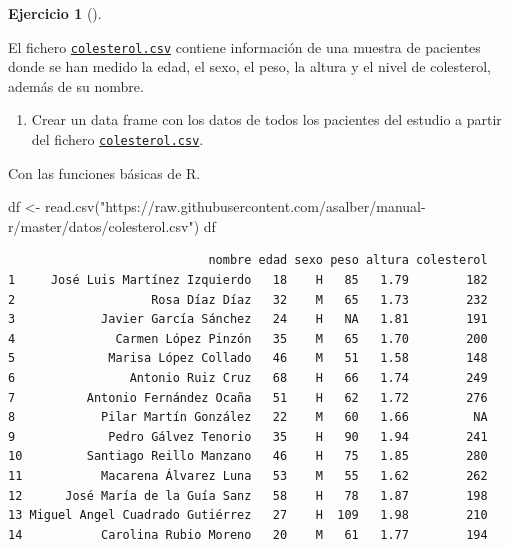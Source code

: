 \documentclass[
  a4paper,
]{scrreport}
\newenvironment{Shaded}{\begin{snugshade}}{\end{snugshade}}
\newcommand{\FunctionTok}[1]{\textcolor[rgb]{0.28,0.35,0.67}{#1}}
\newcommand{\NormalTok}[1]{\textcolor[rgb]{0.00,0.23,0.31}{#1}}
\newcommand{\OtherTok}[1]{\textcolor[rgb]{0.00,0.23,0.31}{#1}}
\newcommand{\StringTok}[1]{\textcolor[rgb]{0.13,0.47,0.30}{#1}}
\providecommand{\tightlist}{%
  \setlength{\itemsep}{0pt}\setlength{\parskip}{0pt}}\usepackage{longtable,booktabs,array}
\theoremstyle{definition}
\newtheorem{exercise}{Ejercicio}[chapter]
\theoremstyle{remark}
\begin{document}
\leavevmode{}%
\begin{exercise}[]\label{exr-preprocesamiento-2}

El fichero \href{datos/colesterol.csv}{\texttt{colesterol.csv}} contiene
información de una muestra de pacientes donde se han medido la edad, el
sexo, el peso, la altura y el nivel de colesterol, además de su nombre.

\begin{enumerate}
\def\labelenumi{\alph{enumi}.}
\tightlist
\item
  Crear un data frame con los datos de todos los pacientes del estudio a
  partir del fichero
  \href{datos/colesterol.csv}{\texttt{colesterol.csv}}.
\end{enumerate}

\begin{tcolorbox}[enhanced jigsaw, breakable, arc=.35mm, leftrule=.75mm, toptitle=1mm, opacitybacktitle=0.6, opacityback=0, title=\textcolor{quarto-callout-tip-color}{\faLightbulb}\hspace{0.5em}{Solución 1}, colframe=quarto-callout-tip-color-frame, titlerule=0mm, bottomtitle=1mm, colback=white, bottomrule=.15mm, colbacktitle=quarto-callout-tip-color!10!white, toprule=.15mm, rightrule=.15mm, left=2mm, coltitle=black]

Con las funciones básicas de R.

\begin{Shaded}
\begin{Highlighting}[]
\NormalTok{df }\OtherTok{\textless{}{-}} \FunctionTok{read.csv}\NormalTok{(}\StringTok{"https://raw.githubusercontent.com/asalber/manual{-}r/master/datos/colesterol.csv"}\NormalTok{)}
\NormalTok{df}
\end{Highlighting}
\end{Shaded}

\begin{verbatim}
                            nombre edad sexo peso altura colesterol
1     José Luis Martínez Izquierdo   18    H   85   1.79        182
2                   Rosa Díaz Díaz   32    M   65   1.73        232
3            Javier García Sánchez   24    H   NA   1.81        191
4              Carmen López Pinzón   35    M   65   1.70        200
5             Marisa López Collado   46    M   51   1.58        148
6                Antonio Ruiz Cruz   68    H   66   1.74        249
7          Antonio Fernández Ocaña   51    H   62   1.72        276
8            Pilar Martín González   22    M   60   1.66         NA
9             Pedro Gálvez Tenorio   35    H   90   1.94        241
10         Santiago Reillo Manzano   46    H   75   1.85        280
11           Macarena Álvarez Luna   53    M   55   1.62        262
12      José María de la Guía Sanz   58    H   78   1.87        198
13 Miguel Angel Cuadrado Gutiérrez   27    H  109   1.98        210
14           Carolina Rubio Moreno   20    M   61   1.77        194
\end{verbatim}


\end{tcolorbox}
\end{exercise}
\end{document}
